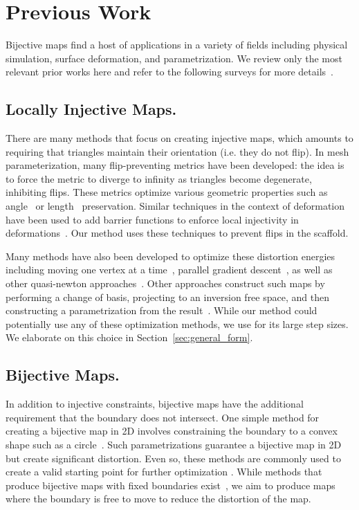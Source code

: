 \section{Previous Work}
\label{sec:related}
Bijective maps find a host of applications in a variety of fields including physical simulation, surface deformation, and parametrization.  We review only the most relevant prior works here and refer to the following surveys for more details~\cite{FloaterSurvey:2005,Sheffer:2006,Hormann:2007}.

\subsection*{Locally Injective Maps.}
 There are many methods that focus on creating  injective maps, which amounts to requiring that triangles maintain their orientation (i.e. they do not flip). In mesh parameterization, many flip-preventing metrics have been developed: the idea is to force the metric to diverge to infinity as triangles become degenerate, inhibiting flips.  These metrics optimize various geometric properties such as angle~\cite{Hormann:2000,Degener:2003} or length~\cite{Sander:2001,Sorkine:2002,Aigerman:2014,Poranne:2014,Smith:2015} preservation.  Similar techniques in the context of deformation have been used to add barrier functions to enforce local injectivity in deformations~\cite{Schuller:2013}. Our method uses these techniques to prevent flips in the scaffold.

Many methods have also been developed to optimize these distortion energies including moving one vertex at a time~\cite{Hormann:2000}, parallel gradient descent~\cite{fu2015computing}, as well as other quasi-newton approaches~\cite{Smith:2015,Kovalsky:2016,rabinovich2017scalable}.  Other approaches construct such maps by performing a change of basis, projecting to an inversion free space, and then constructing a parametrization from the result~\cite{Fu:2016}. While our method could potentially use any of these optimization methods, we use \cite{rabinovich2017scalable} for its large step sizes. We elaborate on this choice in Section~\ref{sec:general_form}.

\subsection*{Bijective Maps.}
In addition to injective constraints, bijective maps have the additional requirement that the boundary does not intersect.  One simple method for creating a bijective map in 2D involves constraining the boundary to a convex shape such as a circle~\cite{Tutte:1963,Floater:97}.  Such parametrizations guarantee a bijective map in 2D but create significant distortion.  Even so, these methods are commonly used to create a valid starting point for further optimization \cite{Schuller:2013,Smith:2015,rabinovich2017scalable}.  While methods that produce bijective maps with fixed boundaries exist~\cite{Weber:2014:LIP,Campen:2016}, we aim to produce maps where the boundary is free to move to reduce the distortion of the map.  

